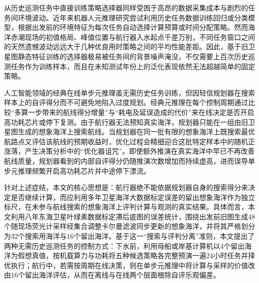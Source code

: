 从历史巡测任务中直接训练策略选择器同样受困于高昂的数据采集成本与剧烈的任务间环境波动。近年来机器人元推理研究尝试利用历史任务数据训练回归或分类模型，根据出发前的环境特征为每次任务自动选择计算预算或时间分配策略\cite{sung2021quit, magnino2026metareasoning}。然而海洋赤潮现场的初值格局、峰值位置与航行器入水起点千差万别，不同任务窗口之间的天然遗憾波动远远大于几种优良用时策略之间的平均性能差距。因此，基于旧卫星图静态特征训练的选择器极易被任务间的背景噪声淹没，不仅需要上百次历史巡测任务作为训练样本，而且在未知测试年份上的泛化表现依然无法超越简单的固定策略。

人工智能领域的经典在线单步元推理虽无需历史任务训练，但因轻信规划器在搜索样本上的自评得分而不可避免地陷入过度规划\cite{horvitz1987reasoning, russell1991right, cuadron2025overthinking}。经典元推理在每个控制周期通过比较“多算一步带来的航线得分增量”与“耗电及延误造成的代价”来在线决定是否开启高功耗芯片或停下复测\cite{lin2015metareasoning, elboher2023formal}。由于航行器无法预知真实海洋，规划器只能在一组由旧卫星图生成的想象海洋上搜索航线。当规划器在同一批有限的想象海洋上既搜索最优航路点又评估该航线的预期收益时，优化过程会精细迎合这批特定样本中的随机正涨落，产生决策分析中的“优化器诅咒”\cite{smith2006curse, vanhasselt2010double}。即使额外推演在真实海洋中早已不再改善航线质量，规划器看到的内部自评得分仍随推演次数增加而持续虚高，进而误导单步元推理频繁开启高功耗芯片并中途停下漂流\cite{jiang2015horizon, cuadron2025overthinking}。

针对上述症结，本文的核心思想是：航行器绝不能依据规划器自身的搜索得分来决定是否继续计算，而应利用多年卫星海洋大数据标定误差的留出想象海洋作为独立标尺，在未参与航线搜索的想象海洋上评判计算与观测的真实结果。具体而言，本文利用八年东海卫星叶绿素数据标定滞后底图的误差统计，围绕出发前旧图生成48个随现场荧光计采样经集合调整卡尔曼滤波\cite{anderson2001eakf, gaspari1999correlation}同步更新的想象海洋，并将其严格划分为32个搜索用海洋与16个留出海洋。基于这一“搜索与评判分离”准则，本文提出了两种无需历史巡测任务的控制方式：下水前，利用母船或岸基计算机以4个留出海洋为假想真值，按机载算力与功耗将五种候选策略各完整预演一遍24小时任务并择优执行；航行中，若需按周期在线决策，则在单步元推理中将计算与采样的价值改由16个留出海洋评估，从而在离线与在线两个层面根除自评乐观偏差。

